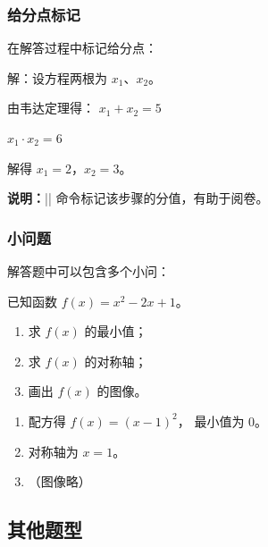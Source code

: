 \subsubsection{给分点标记}

在解答过程中标记给分点：

\begin{latexcode}
  \begin{solution}
    解：设方程两根为 $x_1$、$x_2$。

    由韦达定理得：
    $x_1 + x_2 = 5$ 

    $x_1 \cdot x_2 = 6$ 

    解得 $x_1 = 2$，$x_2 = 3$。
  \end{solution}
\end{latexcode}

\textbf{说明：}|| 命令标记该步骤的分值，有助于阅卷。

\subsubsection{小问题}

解答题中可以包含多个小问：

\begin{latexcode}
  \begin{problem}[points = 12]
    已知函数 $f(x) = x^2 - 2x + 1$。
    \begin{enumerate}
      \item 求 $f(x)$ 的最小值；
      \item 求 $f(x)$ 的对称轴；
      \item 画出 $f(x)$ 的图像。
    \end{enumerate}

    \begin{solution}
      \begin{enumerate}
        \item 配方得 $f(x) = (x-1)^2$，
              最小值为 $0$。
        \item 对称轴为 $x = 1$。
        \item （图像略）
      \end{enumerate}
    \end{solution}
  \end{problem}
\end{latexcode}


\subsection{其他题型}

